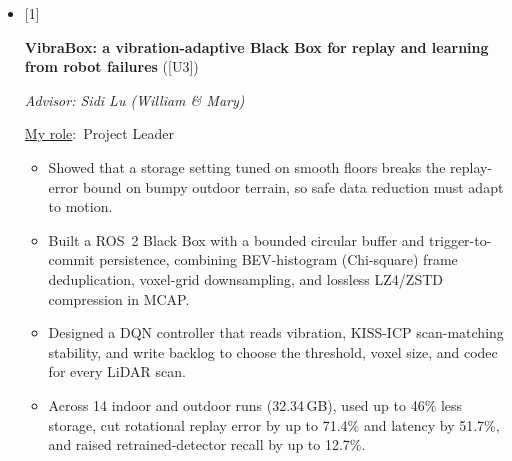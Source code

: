 \documentclass[11pt,letterpaper]{article}
\newenvironment{numbered}[1][3.1em]
  {\begin{itemize}[leftmargin=#1, labelwidth=\dimexpr#1-0.5em\relax,
                   labelsep=0.5em, align=left, itemsep=3pt, topsep=2pt]}
  {\end{itemize}}
\newcommand{\myrole}{\underline{My role}:}
\begin{document}
\begin{numbered}[2.2em]
\begin{itemize}
        with BEV histograms and the VLM.
      \item Added area-average and vibration-calibrated voxel-grid downsampling,
        and a confidence monitor that keeps failure episodes for targeted
        retraining.
      \item Raised camera mAP@50 on the RovaX robotic vehicle from 52.8\% to
        72.9\%, cut inference latency by 31\% and decision age from 136\,ms to
        63\,ms, and reduced LiDAR trajectory error by 75\%.
    \end{itemize}
  \item[{[1]}] {\raggedright \textbf{VibraBox: a vibration-adaptive Black Box for replay and
    learning from robot failures} ([U3])\par}\nobreak
    \textit{Advisor: Sidi Lu (William \& Mary)}\par\nobreak
    \myrole\ Project Leader
    \begin{itemize}
      \item Showed that a storage setting tuned on smooth floors breaks the
        replay-error bound on bumpy outdoor terrain, so safe data reduction must
        adapt to motion.
      \item Built a ROS~2 Black Box with a bounded circular buffer and
        trigger-to-commit persistence, combining BEV-histogram (Chi-square)
        frame deduplication, voxel-grid downsampling, and lossless LZ4/ZSTD
        compression in MCAP.
      \item Designed a DQN controller that reads vibration, KISS-ICP
        scan-matching stability, and write backlog to choose the threshold,
        voxel size, and codec for every LiDAR scan.
      \item Across 14 indoor and outdoor runs (32.34\,GB), used up to 46\% less
        storage, cut rotational replay error by up to 71.4\% and latency by
        51.7\%, and raised retrained-detector recall by up to 12.7\%.
    \end{itemize}
\end{numbered}

\end{document}
